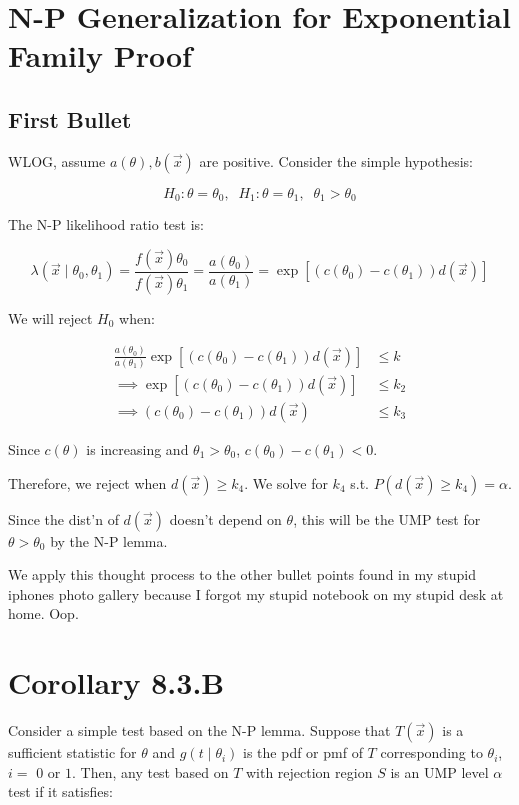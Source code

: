 \documentclass[a4paper]{article}
\begin{document}
\section*{N-P Generalization for Exponential Family Proof}

\subsection*{First Bullet}

WLOG, assume $a(\theta), b(\vec{x})$ are positive. Consider the simple hypothesis:

\[H_0: \theta = \theta_0, \;\; H_1: \theta = \theta_1, \;\; \theta_1 > \theta_0\]

The N-P likelihood ratio test is:

\[
	\lambda(\vec{x} \mid \theta_0, \theta_1) = 
	\frac{f(\vec{x}) \theta_0}{f(\vec{x})\theta_1} = 
	\frac{a(\theta_0)}{a(\theta_1)} = 
	\exp\left[ (c(\theta_0) - c(\theta_1))d(\vec{x}) \right]
\]

We will reject $H_0$ when:

\begin{align}
	\frac{a(\theta_0)}{a(\theta_1)} \exp\left[ (c(\theta_0) - c(\theta_1))d(\vec{x}) \right] &\leq k \\
	\implies  \exp\left[ (c(\theta_0) - c(\theta_1))d(\vec{x}) \right] & \leq k_2 \\
	\implies  (c(\theta_0) - c(\theta_1))d(\vec{x}) &\leq k_3 
\end{align}

Since $c(\theta)$ is increasing and $\theta_1 > \theta_0$, $c(\theta_0) - c(\theta_1) < 0$. 

Therefore, we reject when $d(\vec{x}) \geq k_4$. We solve for $k_4$ s.t. $P(d(\vec{x}) \geq k_4) = \alpha$.

Since the dist'n of $d(\vec{x})$ doesn't depend on $\theta$, this will be the UMP test for $\theta > \theta_0$ by the N-P lemma. 

We apply this thought process to the other bullet points found in my stupid iphones photo gallery because I forgot my stupid notebook on my stupid desk at home. Oop.

\section*{Corollary 8.3.B}

Consider a simple test based on the N-P lemma. Suppose that $T(\vec{x})$ is a sufficient statistic for $\theta$ and $g(t \mid \theta_i)$ is the pdf or pmf of $T$ corresponding to $\theta_i$, $i = $ $0$ or $1$. Then, any test based on $T$ with rejection region $S$ is an UMP level $\alpha$ test if it satisfies:
\end{document}
